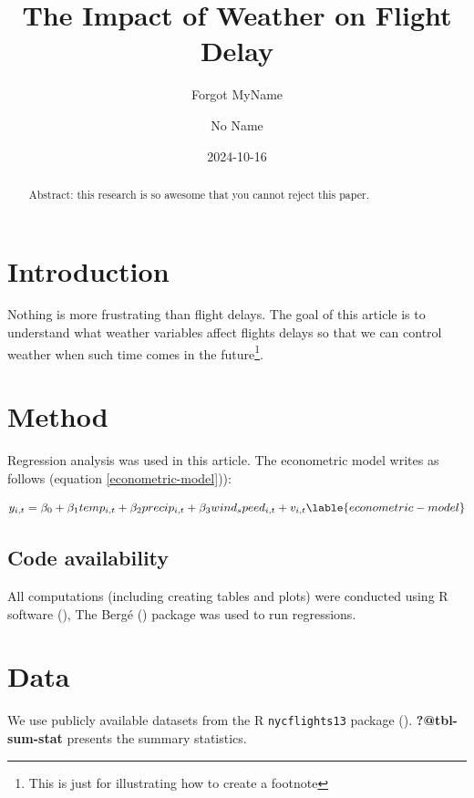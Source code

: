 \documentclass[
]{article}
\title{The Impact of Weather on Flight Delay}
\author{Forgot MyName}
\affil{%
                  Random University
              }
\author{No Name}
\affil{%
                  Highest-ranked University
              }
\date{2024-10-16}
\begin{document}
\maketitle
\begin{abstract}
Abstract: this research is so awesome that you cannot reject this paper.
\end{abstract}


\section{Introduction}\label{introduction}

Nothing is more frustrating than flight delays. The goal of this article
is to understand what weather variables affect flights delays so that we
can control weather when such time comes in the future\footnote{This is
  just for illustrating how to create a footnote}.

\section{Method}\label{method}

Regression analysis was used in this article. The econometric model
writes as follows (equation \ref{econometric-model})):

\begin{align}
y_{i,t} = \beta_0 + \beta_1 temp_{i,t} + \beta_2 precip_{i,t} + \beta_3 wind_speed_{i,t} + v_{i,t} \lable{econometric-model}
\end{align}

\subsection{Code availability}\label{code-availability}

All computations (including creating tables and plots) were conducted
using R software (), The Bergé
() package was used to run regressions.

\section{Data}\label{data}

We use publicly available datasets from the R \texttt{nycflights13}
package ().
\textbf{?@tbl-sum-stat} presents the summary statistics.
\end{document}
